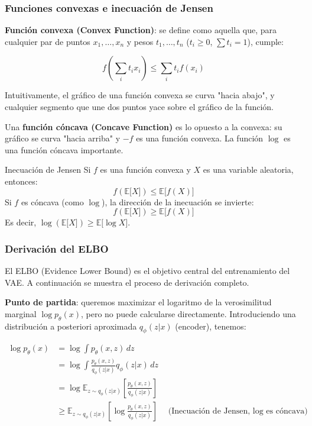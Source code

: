 \subsubsection{Funciones convexas e inecuación de Jensen}

\textbf{Función convexa (Convex Function)}: se define como aquella que, para cualquier par de puntos $x_1, \ldots, x_n$ y pesos $t_1, \ldots, t_n$ ($t_i \geq 0$, $\sum t_i = 1$), cumple:

$$f\left(\sum_i t_i x_i\right) \leq \sum_i t_i f(x_i)$$

Intuitivamente, el gráfico de una función convexa se curva "hacia abajo", y cualquier segmento que une dos puntos yace sobre el gráfico de la función.

Una \textbf{función cóncava (Concave Function)} es lo opuesto a la convexa: su gráfico se curva "hacia arriba" y $-f$ es una función convexa. La función $\log$ es una función cóncava importante.

\begin{importantbox}{Inecuación de Jensen}
Si $f$ es una función convexa y $X$ es una variable aleatoria, entonces:
$$f(\mathbb{E}{[}X{]}) \leq \mathbb{E}{[}f(X){]}$$
Si $f$ es cóncava (como $\log$), la dirección de la inecuación se invierte:
$$f(\mathbb{E}{[}X{]}) \geq \mathbb{E}{[}f(X){]}$$
Es decir, $\log(\mathbb{E}{[}X{]}) \geq \mathbb{E}{[}\log X{]}$.
\end{importantbox}

\subsubsection{Derivación del ELBO}

El ELBO (Evidence Lower Bound) es el objetivo central del entrenamiento del VAE. A continuación se muestra el proceso de derivación completo.

\textbf{Punto de partida}: queremos maximizar el logaritmo de la verosimilitud marginal $\log p_\theta(x)$, pero no puede calcularse directamente. Introduciendo una distribución a posteriori aproximada $q_\phi(z|x)$ (encoder), tenemos:

\begin{align}
\log p_\theta(x) &= \log \int p_\theta(x, z) \, dz \nonumber \\
&= \log \int \frac{p_\theta(x, z)}{q_\phi(z|x)} q_\phi(z|x) \, dz \nonumber \\
&= \log \mathbb{E}_{z \sim q_\phi(z|x)} \left[\frac{p_\theta(x, z)}{q_\phi(z|x)}\right] \nonumber \\
&\geq \mathbb{E}_{z \sim q_\phi(z|x)} \left[\log \frac{p_\theta(x, z)}{q_\phi(z|x)}\right] \quad \text{(Inecuación de Jensen, $\log$ es cóncava)}
\end{align}

